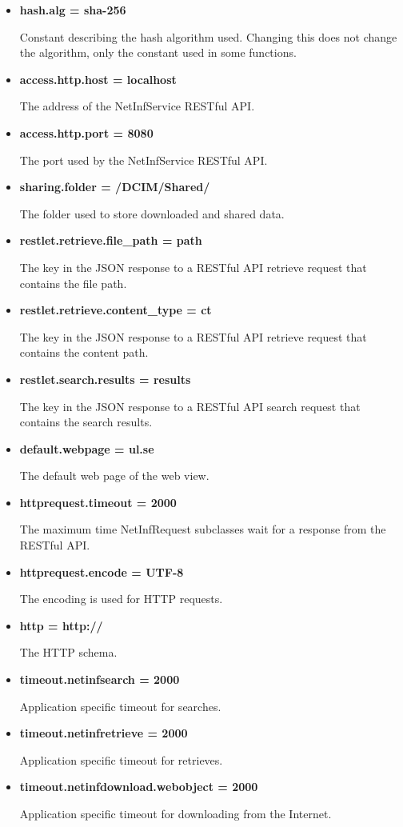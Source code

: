 \begin{itemize}
	\item {\bf hash.alg = sha-256}
	
	Constant describing the hash algorithm used. Changing this does not change the algorithm, only the constant used in some functions.
	
	\item {\bf access.http.host = localhost}
	
	The address of the NetInfService RESTful API.
	
	\item {\bf access.http.port = 8080}
	
	The port used by the NetInfService RESTful API.
	
	\item {\bf sharing.folder = /DCIM/Shared/}
	
	The folder used to store downloaded and shared data.
	
	\item {\bf restlet.retrieve.file\_path = path}
	
	The key in the JSON response to a RESTful API retrieve request that contains the file path.
	
	\item {\bf restlet.retrieve.content\_type = ct}
	
	The key in the JSON response to a RESTful API retrieve request that contains the content path.
	
	\item {\bf restlet.search.results = results}
	
	The key in the JSON response to a RESTful API search request that contains the search results.
	
	\item {\bf default.webpage = ul.se}
	
	The default web page of the web view.
	
	\item {\bf httprequest.timeout = 2000}
	
	The maximum time NetInfRequest subclasses wait for a response from the RESTful API.
	
	\item {\bf httprequest.encode = UTF-8}
	
	The encoding is used for HTTP requests.
	
	\item {\bf http = http://}
	
	The HTTP schema.
	
	\item {\bf timeout.netinfsearch = 2000}
	
	Application specific timeout for searches.
	
	\item {\bf timeout.netinfretrieve = 2000}
	
	Application specific timeout for retrieves.
	
	\item {\bf timeout.netinfdownload.webobject = 2000}
	
	Application specific timeout for downloading from the Internet.
	
\end{itemize}

